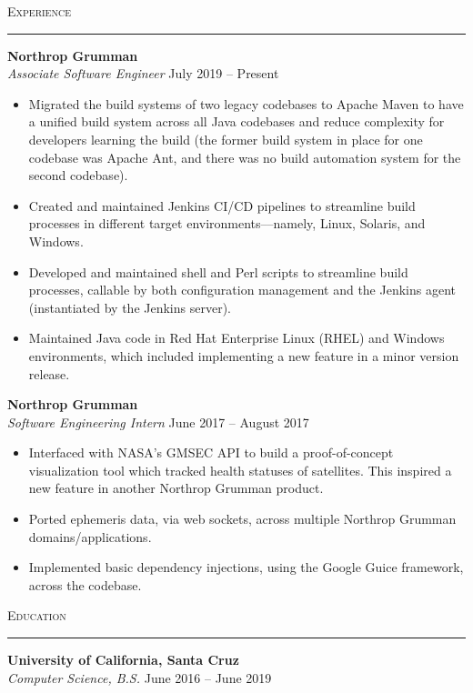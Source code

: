 \documentclass{res}
\begin{document}
\begin{resume}
\textsc{{\Large Experience}}
\vspace{0.5mm}
\hrule width18.5cm
\textbf{Northrop Grumman}\\
\textit{Associate Software Engineer}
\hfill
July 2019 -- Present\\[1mm]
	\begin{itemize}
		\vspace{-3mm}
    \item Migrated the build systems of two legacy codebases to Apache Maven to have a unified build system across all Java codebases and reduce complexity for developers learning the build (the former build system in place for one codebase was Apache Ant, and there was no build automation system for the second codebase).
    \item Created and maintained Jenkins CI/CD pipelines to streamline build processes in different target environments--–namely, Linux, Solaris, and Windows.
    \item Developed and maintained shell and Perl scripts to streamline build processes, callable by both configuration management and the Jenkins agent (instantiated by the Jenkins server).
    \item Maintained Java code in Red Hat Enterprise Linux (RHEL) and Windows environments, which included implementing a new feature in a minor version release.
  \end{itemize}
\textbf{Northrop Grumman}\\
\textit{Software Engineering Intern}
\hfill
June 2017 -- August 2017\\[1mm]
	\begin{itemize}
		\vspace{-3mm}
		\item Interfaced with NASA's GMSEC API to build a proof-of-concept visualization tool which tracked health statuses of satellites. This inspired a new feature in another Northrop Grumman product.
		\item Ported ephemeris data, via web sockets, across multiple Northrop Grumman domains/applications.
		\item Implemented basic dependency injections, using the Google Guice framework, across the codebase.
	\end{itemize}

\textsc{{\Large Education}}
\vspace{0.5mm}
\hrule width18.5cm
\textbf{University of California, Santa Cruz}\\
\textit{Computer Science, B.S.}
\hfill
June 2016 -- June 2019\\
\vspace{-4mm}


\end{resume}
\end{document}
